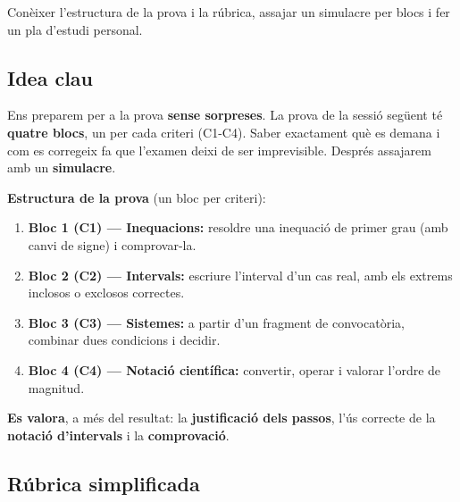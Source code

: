 %
{Conèixer l'estructura de la prova i la rúbrica, assajar un simulacre per blocs i fer un pla d'estudi personal.}

\subsection{Idea clau}

Ens preparem per a la prova \textbf{sense sorpreses}. La prova de la sessió següent
té \textbf{quatre blocs}, un per cada criteri (C1-C4). Saber exactament què es demana
i com es corregeix fa que l'examen deixi de ser imprevisible. Després assajarem amb
un \textbf{simulacre}.

\begin{idea}
\textbf{Estructura de la prova} (un bloc per criteri):
\begin{enumerate}[leftmargin=1.6em, itemsep=2pt]
  \item \textbf{Bloc 1 (C1) — Inequacions:} resoldre una inequació de primer grau (amb
        canvi de signe) i comprovar-la.
  \item \textbf{Bloc 2 (C2) — Intervals:} escriure l'interval d'un cas real, amb els
        extrems inclosos o exclosos correctes.
  \item \textbf{Bloc 3 (C3) — Sistemes:} a partir d'un fragment de convocatòria,
        combinar dues condicions i decidir.
  \item \textbf{Bloc 4 (C4) — Notació científica:} convertir, operar i valorar
        l'ordre de magnitud.
\end{enumerate}
\textbf{Es valora}, a més del resultat: la \textbf{justificació dels passos}, l'ús
correcte de la \textbf{notació d'intervals} i la \textbf{comprovació}.
\end{idea}

\subsection{Rúbrica simplificada}

